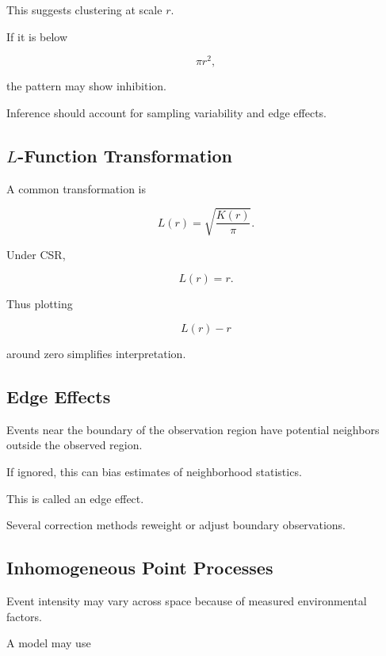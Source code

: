 This suggests clustering at scale \(r\).

If it is below

\[
\pi r^2,
\]

the pattern may show inhibition.

Inference should account for sampling variability and edge effects.

\subsection{\(L\)-Function Transformation}
\label{subsec:ripley-l-function}

A common transformation is

\[
\boxed{
L(r)
=
\sqrt{
\frac{
K(r)
}{
\pi
}
}.
}
\]

Under CSR,

\[
\boxed{
L(r)=r.
}
\]

Thus plotting

\[
L(r)-r
\]

around zero simplifies interpretation.

\subsection{Edge Effects}
\label{subsec:spatial-edge-effects}

Events near the boundary of the observation region have potential
neighbors outside the observed region.

If ignored, this can bias estimates of neighborhood statistics.

This is called an edge effect.

Several correction methods reweight or adjust boundary observations.

\subsection{Inhomogeneous Point Processes}
\label{subsec:inhomogeneous-point-processes}

Event intensity may vary across space because of measured environmental
factors.

A model may use

